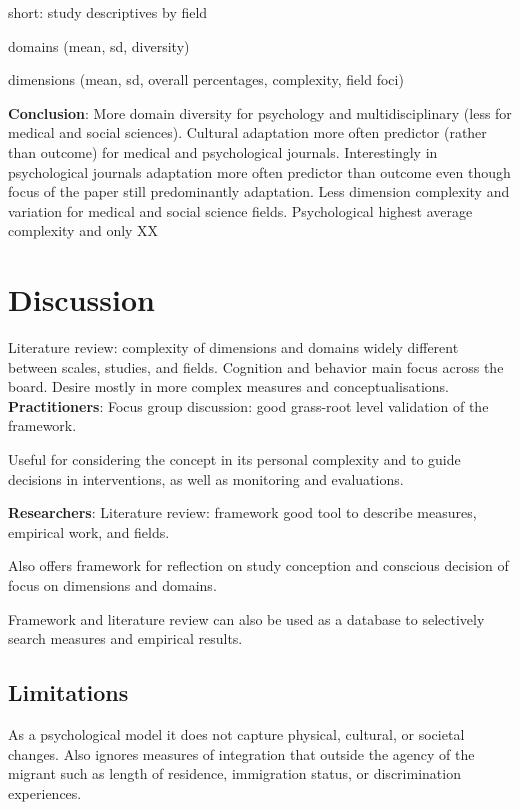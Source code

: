 \documentclass[man, 12pt, a4paper]{apa7}
\begin{document}
short: study descriptives by field

domains (mean, sd, diversity)

dimensions (mean, sd, overall percentages, complexity, field foci)

\textbf{Conclusion}: More domain diversity for psychology and multidisciplinary (less for medical and social sciences). Cultural adaptation more often predictor (rather than outcome) for medical and psychological journals. Interestingly in psychological journals adaptation more often predictor than outcome even though focus of the paper still predominantly adaptation. Less dimension complexity and variation for medical and social science fields. Psychological highest average complexity and only XX%

\section{Discussion}

Literature review: complexity of dimensions and domains widely different between scales, studies, and fields. Cognition and behavior main focus across the board. Desire mostly in more complex measures and conceptualisations.
\textbf{Practitioners}: Focus group discussion: good grass-root level validation of the framework.

Useful for considering the concept in its personal complexity and to guide decisions in interventions, as well as monitoring and evaluations. 

\textbf{Researchers}: Literature review: framework good tool to describe measures, empirical work, and fields.

Also offers framework for reflection on study conception and conscious decision of focus on dimensions and domains.

Framework and literature review can also be used as a database to selectively search measures and empirical results.
\subsection{Limitations}
As a psychological model it does not capture physical, cultural, or societal changes. Also ignores measures of integration that outside the agency of the migrant such as length of residence, immigration status, or discrimination experiences.
\end{document}
